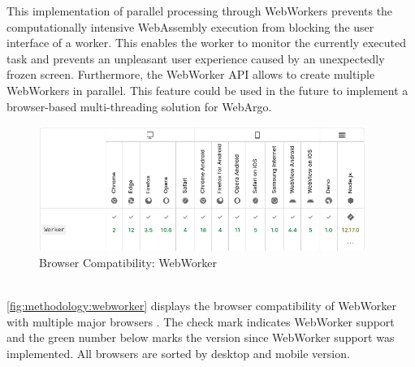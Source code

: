 This implementation of parallel processing through WebWorkers prevents the computationally intensive WebAssembly execution from blocking the user interface of a worker. This enables the worker to monitor the currently executed task and prevents an unpleasant user experience caused by an unexpectedly frozen screen. Furthermore, the WebWorker \ac{API} allows to create multiple WebWorkers in parallel. This feature could be used in the future to implement a browser-based multi-threading solution for WebArgo.
\begin{figure}[htbp]
  \centering
  \includegraphics[width=0.95\textwidth]{gfx/figures/webworker-browsercompability.png}
  \caption{Browser Compatibility: WebWorker \cite{methodology:webworkers}}
  \label{fig:methodology:webworker}
\end{figure}
~\\
\autoref{fig:methodology:webworker} displays the browser compatibility of WebWorker with multiple major browsers \cite{methodology:webworkers}. The check mark indicates WebWorker support and the green number below marks the version since WebWorker support was implemented. All browsers are sorted by desktop and mobile version.

